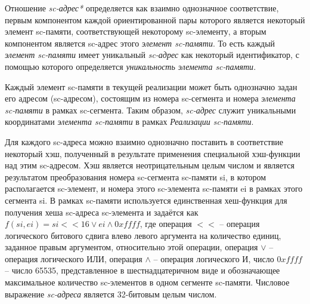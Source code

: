 \begin{SCn}
\end{SCn}

Отношение \textit{sc-адрес*} определяется как взаимно однозначное соответствие, первым компонентом каждой ориентированной пары которого является некоторый элемент sc-памяти, соответствующей некоторому sc-элементу, а вторым компонентом является sc-адрес этого \textit{элемент sc-памяти}. То есть каждый \textit{элемент sc-памяти} имеет уникальный \textit{sc-адрес} как некоторый идентификатор, с помощью которого определяется \textit{уникальность элемента sc-памяти}.

Каждый элемент sc-памяти в текущей реализации может быть однозначно задан его адресом (sc-адресом), состоящим из номера sc-сегмента и номера \textit{элемента sc-памяти} в рамках sc-сегмента. Таким образом, \textit{sc-адрес} служит уникальными координатами \textit{элемента sc-памяти} в рамках \textit{Реализации sc-памяти}.

Для каждого sc-адреса можно взаимно однозначно поставить в соответствие некоторый хэш, полученный в результате применения специальной хэш-функции над этим sc-адресом. Хэш является неотрицательным целым числом и является результатом преобразования номера sc-сегмента sc-памяти si, в котором располагается sc-элемент, и номера этого sc-элемента sc-памяти ei в рамках этого сегмента si. В рамках sc-памяти используется единственная хеш-функция для получения хеша sc-адреса sc-элемента и задаётся как $f(si, ei) = si << 16 \vee ei \wedge 0xffff$, где операция $<<$ -- операция логического битового сдвига влево левого аргумента на количество единиц, заданное правым аргументом, относительно этой операции, операция $\vee$ -- операция логического ИЛИ, операция $\wedge$ -- операция логического И, число $0xffff$ -- число 65535, представленное в шестнадцатеричном виде и обозначающее максимальное количество sc-элементов в одном сегменте sc-памяти. Числовое выражение \textit{sc-адреса} является 32-битовым целым числом.

\begin{SCn}
\end{SCn}

